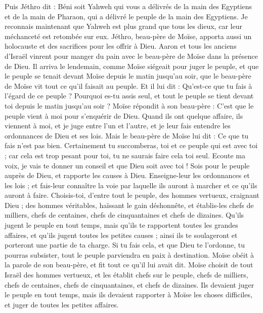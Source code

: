 \begin{multicols}{2}
Puis Jéthro dit : Béni soit Yahweh qui vous a délivrés de la main des Egyptiens et de la main de Pharaon, qui a délivré le peuple de la main des Egyptiens.
Je reconnais maintenant que Yahweh est plus grand que tous les dieux, car leur méchanceté est retombée sur eux.
Jéthro, beau-père de Moïse, apporta aussi un holocauste et des sacrifices pour les offrir à Dieu. Aaron et tous les anciens d'Israël vinrent pour manger du pain avec le beau-père de Moïse dans la présence de Dieu.
Il arriva le lendemain, comme Moïse siégeait pour juger le peuple, et que le peuple se tenait devant Moïse depuis le matin jusqu'au soir,
que le beau-père de Moïse vit tout ce qu'il faisait au peuple. Et il lui dit : Qu'est-ce que tu fais à l'égard de ce peuple ? Pourquoi es-tu assis seul, et tout le peuple se tient devant toi depuis le matin jusqu'au soir ?
Moïse répondit à son beau-père : C'est que le peuple vient à moi pour s'enquérir de Dieu.
Quand ils ont quelque affaire, ils viennent à moi, et je juge entre l'un et l'autre, et je leur fais entendre les ordonnances de Dieu et ses lois.
Mais le beau-père de Moïse lui dit : Ce que tu fais n'est pas bien.
Certainement tu succomberas, toi et ce peuple qui est avec toi ; car cela est trop pesant pour toi, tu ne saurais faire cela toi seul.
Ecoute ma voix, je vais te donner un conseil et que Dieu soit avec toi ! Sois pour le peuple auprès de Dieu, et rapporte les causes à Dieu.
Enseigne-leur les ordonnances et les lois ; et fais-leur connaître la voie par laquelle ils auront à marcher et ce qu'ils auront à faire.
Choisis-toi, d'entre tout le peuple, des hommes vertueux, craignant Dieu ; des hommes véritables, haïssant le gain déshonnête, et établis-les chefs de milliers, chefs de centaines, chefs de cinquantaines et chefs de dizaines.
Qu'ils jugent le peuple en tout temps, mais qu'ils te rapportent toutes les grandes affaires, et qu'ils jugent toutes les petites causes ; ainsi ils te soulageront et porteront une partie de ta charge.
Si tu fais cela, et que Dieu te l’ordonne, tu pourras subsister, tout le peuple parviendra en paix à destination.
Moïse obéit à la parole de son beau-père, et fit tout ce qu'il lui avait dit.
Moïse choisit de tout Israël des hommes vertueux, et les établit chefs sur le peuple, chefs de milliers, chefs de centaines, chefs de cinquantaines, et chefs de dizaines.
Ils devaient juger le peuple en tout temps, mais ils devaient rapporter à Moïse les choses difficiles, et juger de toutes les petites affaires.

\end{multicols}

